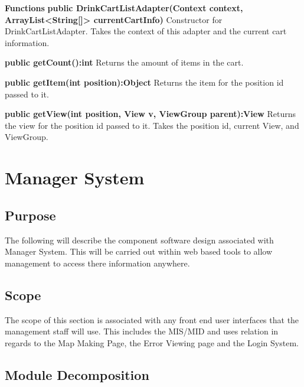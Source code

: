 \documentclass [10pt]{article}
\begin{document}
\textbf{Functions}
\textbf{public DrinkCartListAdapter(Context context, ArrayList<String[]> currentCartInfo)}
Constructor for DrinkCartListAdapter. Takes the context of this adapter and the current cart information.

\textbf{public getCount():int}
Returns the amount of items in the cart.

\textbf{public getItem(int position):Object}
Returns the item for the position id passed to it.

\textbf{public getView(int position, View v, ViewGroup parent):View}
Returns the view for the position id passed to it. Takes the position id, current View, and ViewGroup.


\pagebreak



\section {Manager System}


\subsection{Purpose}
The following will describe the component software design associated with Manager System. This will be carried out within web based tools to allow management to access there information anywhere.


\subsection{Scope}

The scope of this section is associated with any front end user interfaces that the management staff will use. This includes the MIS/MID and uses relation in regards to the Map Making Page, the Error Viewing page and the Login System. 


\subsection{Module Decomposition}
\end{document}
